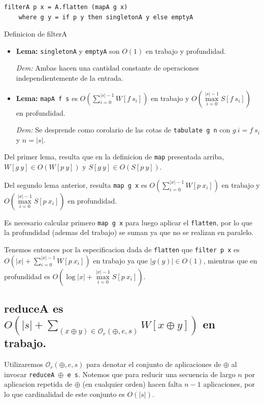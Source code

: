 \documentclass[12pt]{article}
\begin{document}
\begin{table}[h]
\begin{lstlisting}
filterA p x = A.flatten (mapA g x)
    where g y = if p y then singletonA y else emptyA
\end{lstlisting}
\caption{Definicion de filterA}
\end{table}
\begin{itemize}
\item \textbf{Lema:} \texttt{singletonA} y \texttt{emptyA} son $O(1)$ en trabajo y profundidad.

 \textit{Dem:} Ambas hacen una cantidad constante de operaciones independientemente de la entrada.
 
\item \textbf{Lema:} \texttt{mapA f s} es $O( \sum\limits_{i=0}^{|s|-1} W[f\ s_i] )$ en trabajo y $O( \max\limits_{i=0}^{|s|-1} S[f\ s_i] )$ en profundidad.

 \textit{Dem:} Se desprende como corolario de las cotas de \texttt{tabulate g n} con $g\ i = f\ s_i$ y $n=|s|$. 
 
\end{itemize}

Del primer lema, resulta que en la definicion de \texttt{map} presentada arriba,  $W[g\ y]\in O(W[p\ y])$ y $S[g\ y]\in O(S[p\ y])$.

Del segundo lema anterior, resulta \texttt{map\ g\ x} es $O(\sum\limits_{i=0}^{|x|-1} W[p\ x_i])$ en trabajo y $O(\max\limits_{i=0}^{|x|-1} S[p\ x_i])$ en profundidad.

Es necesario calcular primero \texttt{map\ g\ x} para luego aplicar el \texttt{flatten}, por lo que la profundidad (ademas del trabajo) se suman ya que no se realizan en paralelo.

Tenemos entonces por la especificacion dada de \texttt{flatten} que \texttt{filter\ p\ x} es $O(|x| + \sum\limits_{i=0}^{|x|-1} W[p\ x_i])$ en trabajo ya que $|g(y)| \in O(1)$, mientras que en profundidad es $O(\log |x| + \max\limits_{i=0}^{|x|-1} S[p\ x_i])$.


\subsection{reduceA es $O(|s| + \sum\limits_{(x\oplus y)\in\mathcal{O}_r(\oplus,e,s)} W[x\oplus y])$ en trabajo.}

Utilizaremos $\mathcal{O}_r(\oplus,e,s)$ para denotar el conjunto de aplicaciones de $\oplus$ al invocar \texttt{reduceA $\oplus$ e s}. Notemos que para reducir una secuencia de largo $n$ por aplicacion repetida de $\oplus$ (en cualquier orden) hacen falta $n-1$ aplicaciones, por lo que cardinalidad de este conjunto es $O(|s|)$.
\end{document}
